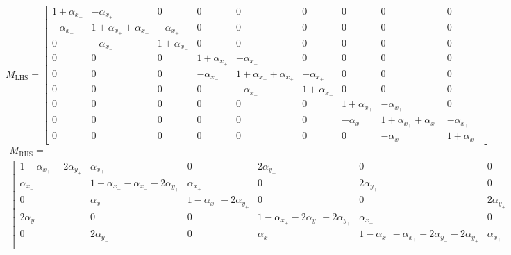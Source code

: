 \documentclass{scrartcl}
\begin{document}
\begin{landscape}
\begin{equation}
M_\mathrm{LHS} = \left[ \begin{smallmatrix}
1 + \alpha_{x_+} & -\alpha_{x_+}                   & 0                & 0 & 0 & 0 & 0 & 0 & 0\\
-\alpha_{x_-}    & 1 + \alpha_{x_+} + \alpha_{x_-} & -\alpha_{x_+}    & 0 & 0 & 0 & 0 & 0 & 0\\
0                & -\alpha_{x_-}                   & 1 + \alpha_{x_-} & 0 & 0 & 0 & 0 & 0 & 0\\
0 & 0 & 0 & 1 + \alpha_{x_+} & -\alpha_{x_+}                   & 0                & 0 & 0 & 0\\
0 & 0 & 0 & -\alpha_{x_-}    & 1 + \alpha_{x_-} + \alpha_{x_+} & -\alpha_{x_+}    & 0 & 0 & 0\\
0 & 0 & 0 & 0                & -\alpha_{x_-}                   & 1 + \alpha_{x_-} & 0 & 0 & 0\\
0 & 0 & 0 & 0 & 0 & 0 & 1 + \alpha_{x_+}  & -\alpha_{x_+}                   & 0\\
0 & 0 & 0 & 0 & 0 & 0 & -\alpha_{x_-}     & 1 + \alpha_{x_+} + \alpha_{x_-} & -\alpha_{x_+}\\
0 & 0 & 0 & 0 & 0 & 0 & 0                 & -\alpha_{x_-}                   & 1 + \alpha_{x_-}             
\end{smallmatrix} \right]
\end{equation}
\begin{multline}
M_\mathrm{RHS} = \\
\left[ \begin{smallmatrix}
1 - \alpha_{x_+} - 2\alpha_{y_+} & \alpha_{x_+}                                   & 0                               & 2\alpha_{y_+} & 0 & 0 & 0 & 0 & 0\\
\alpha_{x_-}                    & 1 - \alpha_{x_+} - \alpha_{x_-} - 2\alpha_{y_+} & \alpha_{x_+}                    & 0 & 2\alpha_{y_+} & 0 & 0 & 0 & 0\\
0                               & \alpha_{x_-}                                   & 1 - \alpha_{x_-} - 2\alpha_{y_+} & 0 & 0 & 2\alpha_{y_+} & 0 & 0 & 0\\
2\alpha_{y_-} & 0 & 0 & 1 - \alpha_{x_+} - 2\alpha_{y_-} - 2\alpha_{y_+} & \alpha_{x_+}                                                  & 0 & 2\alpha_{y_+} & 0 & 0\\
0 & 2\alpha_{y_-} & 0 & \alpha_{x_-}                                   & 1 - \alpha_{x_-} - \alpha_{x_+} - 2\alpha_{y_-} - 2\alpha_{y_+} & \alpha_{x_+} & 0 & 2\alpha_{y_+} & 0\\

\end{smallmatrix}
\end{multline}
\end{landscape}
\end{document}
